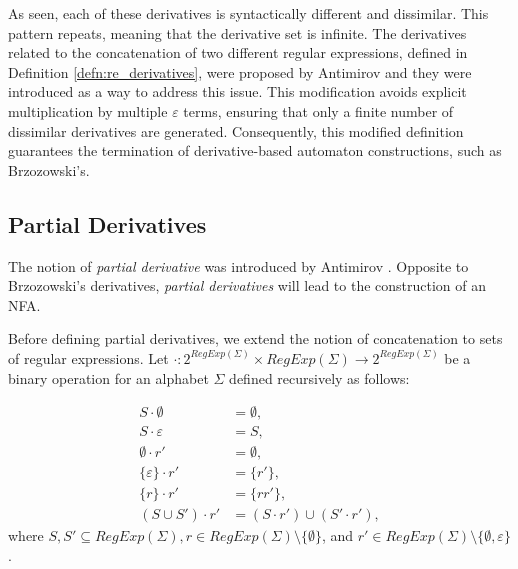 As seen, each of these derivatives is syntactically different and dissimilar.
This pattern repeats, meaning that the derivative set is infinite.
The derivatives related to the concatenation of two different regular expressions, defined in Definition \ref{defn:re_derivatives}, were proposed by Antimirov \cite{pdregex_antimirov} and they were introduced as a way to address this issue. This modification avoids explicit multiplication by multiple $\varepsilon$ terms, ensuring that only a finite number of dissimilar derivatives are generated.
Consequently, this modified definition guarantees the termination of derivative-based automaton constructions, such as Brzozowski's.





\subsection{Partial Derivatives}
The notion of \textit{partial derivative} was introduced by Antimirov \cite{pdregex_antimirov}. Opposite to Brzozowski's derivatives, \textit{partial derivatives} will lead to the construction of an NFA.

Before defining partial derivatives, we extend the notion of concatenation to sets of regular expressions. Let $\cdot : 2^{RegExp(\Sigma)} \times RegExp(\Sigma) \rightarrow 2^{RegExp(\Sigma)}$ be a binary operation for an alphabet $\Sigma$ defined recursively as follows:

\begin{align*}
	S \cdot \emptyset &= \emptyset, \\
	S \cdot \varepsilon &= S, \\
	\emptyset \cdot r' &= \emptyset, \\
	\{ \varepsilon \} \cdot r' &= \{ r' \}, \\
	\{ r \} \cdot r' &= \{rr'\}, \\
	(S \cup S') \cdot r' &= (S \cdot r') \cup (S' \cdot r'),
\end{align*}
where $S, S' \subseteq RegExp(\Sigma), r \in RegExp(\Sigma) \setminus \{\emptyset\}$, and $r' \in RegExp(\Sigma) \setminus \{\emptyset, \varepsilon\}$.

